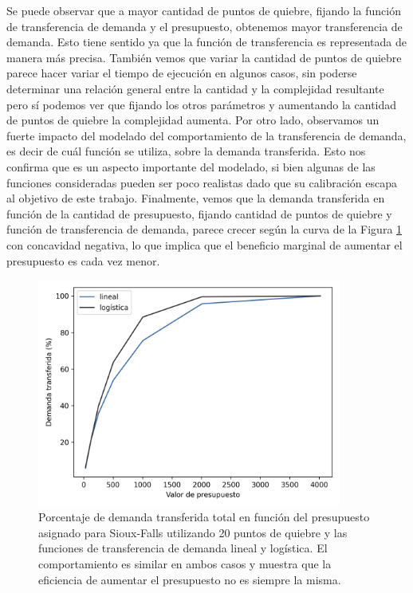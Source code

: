 Se puede observar que a mayor cantidad de puntos de quiebre, fijando la función de transferencia de demanda y el presupuesto, obtenemos mayor transferencia de demanda. Esto tiene sentido ya que la función de transferencia es representada de manera más precisa. También vemos que variar la cantidad de puntos de quiebre parece hacer variar el tiempo de ejecución en algunos casos, sin poderse determinar una relación general entre la cantidad y la complejidad resultante pero sí podemos ver que fijando los otros parámetros y aumentando la cantidad de puntos de quiebre la complejidad aumenta. Por otro lado, observamos un fuerte impacto del modelado del comportamiento de la transferencia de demanda, es decir de cuál función se utiliza, sobre la demanda transferida. Esto nos confirma que es un aspecto importante del modelado, si bien algunas de las funciones consideradas pueden ser poco realistas dado que su calibración escapa al objetivo de este trabajo. Finalmente, vemos que la demanda transferida en función de la cantidad de presupuesto, fijando cantidad de puntos de quiebre y función de transferencia de demanda, parece crecer según la curva de la Figura \ref{fig:demandtransferbybudgetlinear} con concavidad negativa, lo que implica que el beneficio marginal de aumentar el presupuesto es cada vez menor.

\begin{figure}[h!]
  \centering
  \includegraphics[width=10cm]{../resources/demand_by_budget.png}
    \caption{Porcentaje de demanda transferida total en función del presupuesto asignado para Sioux-Falls utilizando 20 puntos de quiebre y las funciones de transferencia de demanda lineal y logística. El comportamiento es similar en ambos casos y muestra que la eficiencia de aumentar el presupuesto no es siempre la misma.}
  \label{fig:demandtransferbybudgetlinear}
\end{figure}

